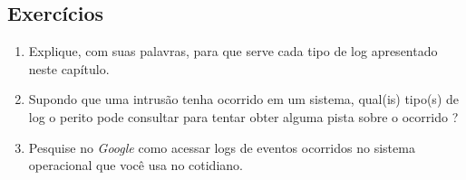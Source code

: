     \subsection{Exercícios}

    \begin{example} \label{cap5_exercicios}
        \begin{enumerate}
            \item Explique, com suas palavras, para que serve cada tipo de log apresentado neste capítulo.
            \item Supondo que uma intrusão tenha ocorrido em um sistema, qual(is) tipo(s) de log o perito pode consultar para tentar obter alguma pista sobre o ocorrido ?
            \item Pesquise no \textit{Google} como acessar logs de eventos ocorridos no sistema operacional que você usa no cotidiano.
        \end{enumerate}
    \end{example}
    
\newpage